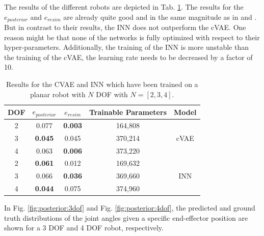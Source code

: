 \documentclass[conference]{IEEEtran}
\begin{document}
The results of the different robots are depicted in Tab. \ref{tab:results}. The results for the $e_{posterior}$ and $e_{resim}$ are already quite good and in the same magnitude as in  \cite{Ardizzone2018} and \cite{Kruse2019}. But in contrast to their results, the INN does not outperform the cVAE. One reason might be that none of the networks is fully optimized with respect to their hyper-parameters. Additionally, the training of the INN is more unstable than the training of the cVAE, the learning rate needs to be decreased by a factor of 10. 
\begin{table}[h]
\centering
\begin{tabular}{|c|c|c|c|c|}
\hline
 DOF & $e_{posterior}$ & $e_{resim}$ & Trainable Parameters & Model \\
 \hline
 2  & 0.077 & \textbf{0.003} & 164,808 & \\
 3  & \textbf{0.045} & 0.045 & 370,214 & cVAE \\
 4  & 0.063 & \textbf{0.006} & 373,220 & \\
 \hline
 2  & \textbf{0.061} & 0.012 & 169,632 & \\
 3  & 0.066 & \textbf{0.036} & 369,660 & INN \\
 4  & \textbf{0.044} & 0.075 & 374,960 & \\
 \hline
\end{tabular}
\vspace{5pt}
\caption{\label{tab:results} Results for the CVAE and INN which have been trained on a planar robot with $N$ DOF with $N=[2, 3, 4]$.}
\end{table}
In Fig. \ref{fig:posterior:3dof} and Fig. \ref{fig:posterior:4dof}, the predicted and ground truth distributions of the joint angles given a specific end-effector position are shown for a 3 DOF and 4 DOF robot, respectively.
\end{document}
